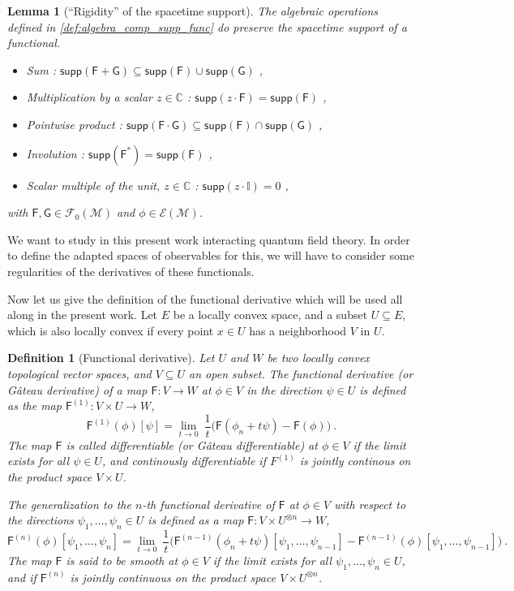 \documentclass[12pt]{book}
\newcommand{\supp}{\mathsf{supp}}
\newcommand{\Ecal}{\mathcal{E}}
\newcommand{\Fcal}{\mathcal{F}}
\newcommand{\Mcal}{\mathcal{M}}
\newcommand{\Cbb}{\mathbb{C}}
\newcommand{\Ibb}{\mathbb{I}}
\newcommand{\Fsf}{\mathsf{F}}
\newcommand{\Gsf}{\mathsf{G}}
\theoremstyle{break}
\newtheorem{lemma}{Lemma}
\newtheorem{definition}{Definition}
\begin{document}
\begin{lemma}[``Rigidity'' of the spacetime support]
The algebraic operations defined in \ref{def:algebra_comp_supp_func} do preserve the spacetime support of a functional. 
%
\begin{itemize}
\item Sum : $\supp(\Fsf + \Gsf) \subseteq \supp(\Fsf) \cup \supp(\Gsf)$ ,
\item Multiplication by a scalar $z\in\Cbb$ : $\supp(z\cdot\Fsf) = \supp(\Fsf)$ ,
\item Pointwise product : $\supp(\Fsf \cdot \Gsf) \subseteq \supp(\Fsf) \cap \supp(\Gsf)$ ,
\item Involution : $\supp(\Fsf^\ast) = \supp(\Fsf)$ ,
\item Scalar multiple of the unit, $z\in\Cbb$ : $\supp(z\cdot\Ibb) = 0 $ ,
\end{itemize}
%
with $\Fsf, \Gsf \in \Fcal_0(\Mcal)$ and $\phi \in \Ecal(\Mcal)$.
\end{lemma}


We want to study in this present work interacting quantum field theory. In order to define the adapted spaces of observables for this, we will have to consider some regularities of the derivatives of these functionals. 




Now let us give the definition of the functional derivative which will be used all along in the present work. Let $E$ be a locally convex space, and a subset $U \subseteq E$, which is also locally convex if every point $x \in U$ has a neighborhood $V$ in $U$. 


\begin{definition}[Functional derivative]\label{def:functional_derivative}
Let $U$ and $W$ be two locally convex topological vector spaces, and $V \subseteq U$ an open subset. The functional derivative (or Gâteau derivative) of a map $\Fsf:  V \to W$ at $\phi \in V$ in the direction $\psi \in U$ is defined as the map $\Fsf^{(1)} : V \times U \to W$,
%
\begin{equation*}
\Fsf^{(1)}(\phi)[\psi] = \lim_{t \to 0} \ \frac{1}{t} \bigg( \Fsf(\phi_n + t \psi) - \Fsf(\phi) \bigg) \ .
\end{equation*}
% 
The map $\Fsf$ is called differentiable (or Gâteau differentiable) at $\phi \in V$ if the limit exists for all $\psi \in U$, and continously differentiable if $F^{(1)}$ is jointly continous on the product space $V \times U$.\par%
%
%
The generalization to the $n$-th functional derivative of $\Fsf$ at $\phi \in V$ with respect to the directions $\psi_1, \dots, \psi_n \in U$ is defined as a map $\Fsf : V \times U^{\otimes n} \to W$,
%
\begin{equation*}%
\Fsf^{(n)}(\phi)[\psi_1,\dots ,\psi_n] = \lim_{t \to 0} \ \frac{1}{t} \bigg( \Fsf^{(n-1)}(\phi_n + t \psi)[\psi_1,\dots ,\psi_{n-1}] - \Fsf^{(n-1)}(\phi)[\psi_1,\dots ,\psi_{n-1}] \bigg) \ .
\end{equation*}
%
The map $\Fsf$ is said to be smooth at $\phi \in V$ if the limit exists for all $\psi_1, \dots, \psi_n \in U$, and if $\Fsf^{(n)}$ is jointly continuous on the product space $V \times U^{\otimes n}$.
\end{definition}
\end{document}
